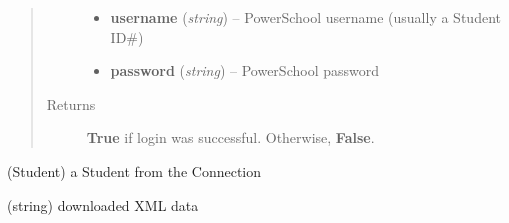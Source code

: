 \documentclass[letterpaper,10pt,english]{sphinxmanual}
\begin{document}
\begin{fulllineitems}
\begin{fulllineitems}
\begin{quote}
\begin{description}
\begin{itemize}
\item {} 
\textbf{username} (\emph{string}) -- PowerSchool username (usually a Student ID\#)

\item {} 
\textbf{password} (\emph{string}) -- PowerSchool password

\end{itemize}

\item[{Returns}] \leavevmode
\textbf{True} if login was successful. Otherwise, \textbf{False}.

\end{description}\end{quote}

\end{fulllineitems}


\begin{fulllineitems}
\label{index:ps.Connection.student}
(Student) a Student from the Connection

\end{fulllineitems}


\begin{fulllineitems}
\label{index:ps.Connection.xml_data}
(string) downloaded XML data

\end{fulllineitems}


\end{fulllineitems}

\end{document}
